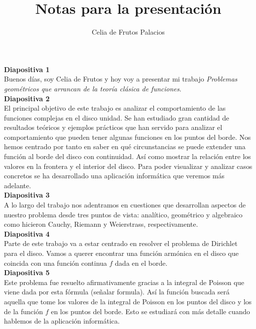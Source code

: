 \documentclass[spanish, a4paper, 12pt]{article}
\begin{document}
\title{Notas para la presentación}
\author{Celia de Frutos Palacios}
\date{}
\maketitle

\textbf{Diapositiva 1} \\

Buenos días, soy Celia de Frutos y hoy voy a presentar mi trabajo \textit{Problemas geométricos que arrancan de la teoría clásica de funciones}. \\

\textbf{Diapositiva 2} \\

El principal objetivo de este trabajo es analizar el comportamiento de las funciones complejas en el disco unidad. Se han estudiado gran cantidad de resultados teóricos y ejemplos prácticos que han servido para analizar el comportamiento que pueden tener algunas funciones en los puntos del borde. Nos hemos centrado por tanto en saber en qué circunstancias se puede extender una función al borde del disco con continuidad. Así como mostrar la relación entre los valores en la frontera y el interior del disco. Para poder visualizar y analizar casos concretos se ha desarrollado una aplicación informática que veremos más adelante. \\

\textbf{Diapositiva 3} \\

A lo largo del trabajo nos adentramos en cuestiones que desarrollan aspectos de nuestro problema desde tres puntos de vista: analítico, geométrico y algebraico como hicieron Cauchy, Riemann y Weierstrass, respectivamente. \\

\textbf{Diapositiva 4} \\

Parte de este trabajo va a estar centrado en resolver el problema de Dirichlet para el disco. Vamos a querer encontrar una función armónica en el disco que coincida con una función continua $f$ dada en el borde. \\

\textbf{Diapositiva 5} \\

Este problema fue resuelto afirmativamente gracias a la integral de Poisson que viene dada por esta fórmula (señalar formula). Así la función buscada será aquella que tome los valores de la integral de Poisson en los puntos del disco y los de la función $f$ en los puntos del borde. Esto se estudiará con más detalle cuando hablemos de la aplicación informática. \\
\end{document}
